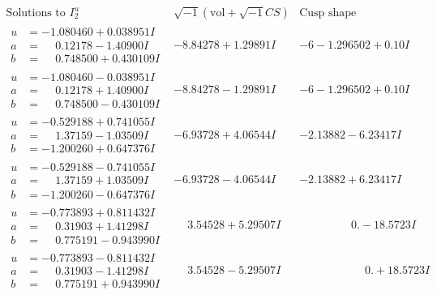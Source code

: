\documentclass[1p]{elsarticle_modified}
\theoremstyle{definition}
\newcommand{\I}{\sqrt{-1}}
\begin{document}
$$\begin{array}{c|c|c}  
\text{Solutions to }I^u_{2}& \I (\text{vol} + \sqrt{-1}CS) & \text{Cusp shape}\\
 \hline 
\begin{aligned}
u &= -1.080460 + 0.038951 I \\
a &= \phantom{-}0.12178 - 1.40900 I \\
b &= \phantom{-}0.748500 + 0.430109 I\end{aligned}
 & -8.84278 + 1.29891 I &                  -6
-1.296502 + 0. 10   I\phantom{ +0.000000I} \\ \hline\begin{aligned}
u &= -1.080460 - 0.038951 I \\
a &= \phantom{-}0.12178 + 1.40900 I \\
b &= \phantom{-}0.748500 - 0.430109 I\end{aligned}
 & -8.84278 - 1.29891 I &                  -6
-1.296502 + 0. 10   I\phantom{ +0.000000I} \\ \hline\begin{aligned}
u &= -0.529188 + 0.741055 I \\
a &= \phantom{-}1.37159 - 1.03509 I \\
b &= -1.200260 + 0.647376 I\end{aligned}
 & -6.93728 + 4.06544 I & -2.13882 - 6.23417 I \\ \hline\begin{aligned}
u &= -0.529188 - 0.741055 I \\
a &= \phantom{-}1.37159 + 1.03509 I \\
b &= -1.200260 - 0.647376 I\end{aligned}
 & -6.93728 - 4.06544 I & -2.13882 + 6.23417 I \\ \hline\begin{aligned}
u &= -0.773893 + 0.811432 I \\
a &= \phantom{-}0.31903 + 1.41298 I \\
b &= \phantom{-}0.775191 - 0.943990 I\end{aligned}
 & \phantom{-}3.54528 + 5.29507 I & \phantom{-0.000000 } 0. - 18.5723 I \\ \hline\begin{aligned}
u &= -0.773893 - 0.811432 I \\
a &= \phantom{-}0.31903 - 1.41298 I \\
b &= \phantom{-}0.775191 + 0.943990 I\end{aligned}
 & \phantom{-}3.54528 - 5.29507 I & \phantom{-0.000000 -}0. + 18.5723 I \\ \hline\begin{aligned}

\end{aligned}
\end{array}$$
\end{document}
